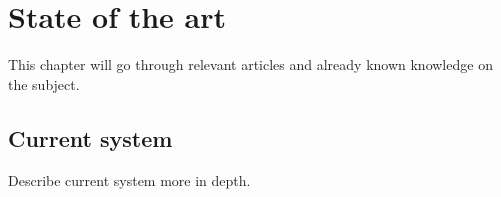 \chapter{State of the art}
This chapter will go through relevant articles and already known knowledge on the subject.

\section{Current system}
Describe current system more in depth.